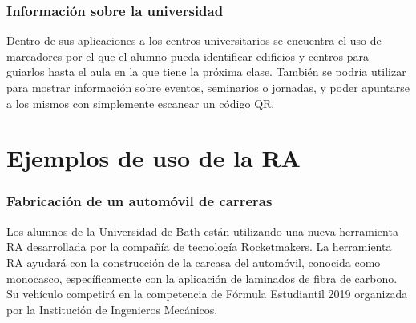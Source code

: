     
\subsubsection{Información sobre la universidad}  

Dentro de sus aplicaciones a los centros universitarios se encuentra el uso de marcadores por el que el alumno pueda identificar edificios y centros para guiarlos hasta el aula en la que tiene la próxima clase. También se podría utilizar para mostrar información sobre eventos, seminarios o jornadas, y poder apuntarse a los mismos con simplemente escanear un código QR.



\section{Ejemplos de uso de la RA}


\subsubsection{Fabricación de un automóvil de carreras} 

Los alumnos de la Universidad de Bath están utilizando una nueva herramienta RA desarrollada por la compañía de tecnología Rocketmakers. La herramienta RA ayudará con la construcción de la carcasa del automóvil, conocida como monocasco, específicamente con la aplicación de laminados de fibra de carbono. Su vehículo competirá en la competencia de Fórmula Estudiantil 2019 organizada por la Institución de Ingenieros Mecánicos.

